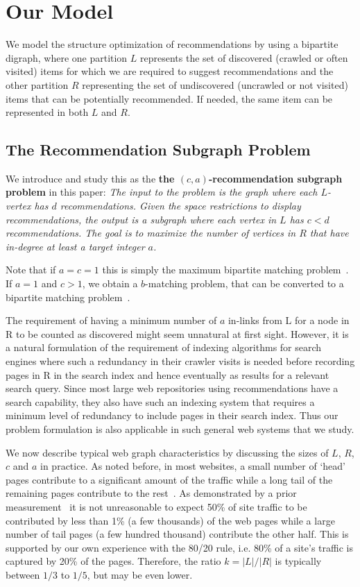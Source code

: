 \section{Our Model}

We model the structure optimization of recommendations by using a bipartite
digraph, where one partition $L$ represents the set of discovered (crawled or often visited) items for which
we are required to suggest recommendations and the other partition $R$
representing the set of undiscovered (uncrawled or not visited) items that can be potentially recommended. If
needed, the same item can be represented in both $L$ and $R$.
\vs

\subsection{The Recommendation Subgraph Problem}
We introduce and study this as the {\bf the $(c, a)$-recommendation subgraph problem} in this paper:
{\em
 The input to the problem is the graph where each
$L$-vertex has $d$ recommendations. Given the space restrictions to
display recommendations, the output is a subgraph where each vertex in
$L$ has $c < d$ recommendations. The goal is to maximize the number of
vertices in $R$ that have in-degree at least a target integer $a$.
}

\vs

Note that if $a=c=1$ this is simply the maximum bipartite
matching problem~\cite{LovaszPlummer1986}. If $a=1$ and $c > 1$, we
obtain a $b$-matching problem, that can be converted to a bipartite
matching problem~\cite{Gabow1983}.\vs

The requirement of having a minimum number of $a$ in-links from L for a node in R to be counted as discovered might seem unnatural at first sight. However, it is a natural formulation of the requirement of indexing algorithms for search engines where such a redundancy in their crawler visits is needed before recording pages in R in the search index and hence eventually as results for a relevant search query. Since most large web repositories using recommendations have a search capability, they also have such an indexing system that requires a minimum level of redundancy to include pages in their search index. Thus our problem formulation is also applicable in such general web systems that we study. \vs

We now describe typical web graph characteristics by discussing the
sizes of $L$, $R$, $c$ and $a$ in practice. As noted before, in most
websites, a small number of `head' pages contribute to a significant
amount of the traffic while a long tail of the remaining pages
contribute to the rest~\cite{HubermanAdamic1999,
  DuDemmerBrewer2006}. As demonstrated by a prior
measurement~\cite{KumarNorrisSun2009} it is not unreasonable to expect
50\% of site traffic to be contributed by less than 1\% (a few
thousands) of the web pages while a large number of tail pages (a few
hundred thousand) contribute the other half. This is supported by our
own experience with the 80/20 rule, i.e. 80\% of a site's traffic is
captured by 20\% of the pages. Therefore, the ratio $k=|L|/|R|$ is
typically between $1/3$ to $1/5$, but may be even lower. \vs

